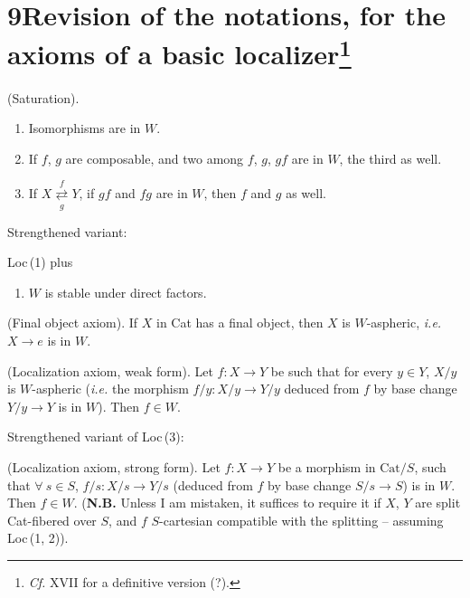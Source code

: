 
\section*{9\quad Revision of the notations, for the axioms of a basic localizer\footnote[43]{\textit{Cf.} XVII for a definitive version (?).}}

\begin{description}[style=sameline,leftmargin=6.5em]
\item[Loc\,(1)] (Saturation).
\begin{enumerate}[leftmargin=2.5em]
\item[$a$)] Isomorphisms are in $W$.
\item[$b$)] If $f$, $g$ are composable, and two among $f$, $g$, $gf$ are in $W$, the third as well.
\item[$c$)] If $X \underset{g}{\overset{f}{\rightleftarrows}} Y$, if $gf$ and $fg$ are in $W$, then $f$ and $g$ as well.
\end{enumerate}
\end{description}
\noindent Strengthened variant:
\begin{description}[style=sameline,leftmargin=6.5em]
\item[Loc\,(1\,bis)] Loc\,(1) plus
\begin{enumerate}[leftmargin=2.5em]
\item[$d$)] $W$ is stable under direct factors.
\end{enumerate}
\item[Loc\,(2)] (Final object axiom). If $X$ in Cat has a final object, then $X$ is $W$-aspheric, \textit{i.e.} $X \longrightarrow e$ is in $W$.
\item[Loc\,(3)] (Localization axiom, weak form). Let $f : X \longrightarrow Y$ be such that for every $y \in Y$, $X/y$ is $W$-aspheric (\textit{i.e.} the morphism $f/y : X/y \longrightarrow Y/y$ deduced from $f$ by base change $Y/y \longrightarrow Y$ is in $W$). Then $f \in W$.
\end{description}
\noindent Strengthened variant of Loc\,(3):
\begin{description}[style=sameline,leftmargin=6.5em]
\item[Loc\,(3\,bis)] (Localization axiom, strong form). Let $f : X \longrightarrow Y$ be a morphism in $\mathrm{Cat}/S$, such that $\forall\ s \in S$, $f/s : X/s \longrightarrow Y/s$ (deduced from $f$ by base change $S/s \longrightarrow S$) is in $W$. Then $f \in W$. (\textbf{N.B.} Unless I am mistaken, it suffices to require it if $X$, $Y$ are split Cat-fibered over $S$, and $f$ $S$-cartesian compatible with the splitting – assuming Loc\,(1, 2)). %
\end{description}
